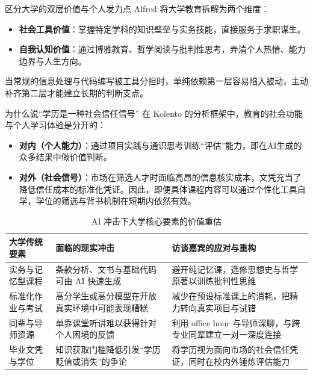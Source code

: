 \documentclass[UTF8,a4paper,11pt,fontset=fandol]{ctexart}
\begin{document}
\begin{importantbox}{区分大学的双层价值与个人发力点}
Alfred 将大学教育拆解为两个维度：
\begin{itemize}
\item \textbf{社会工具价值}：掌握特定学科的知识壁垒与实务技能，直接服务于求职谋生。
\item \textbf{自我认知价值}：通过博雅教育、哲学阅读与批判性思考，弄清个人热情、能力边界与人生方向。
\end{itemize}
当常规的信息处理与代码编写被工具分担时，单纯依赖第一层容易陷入被动，主动补齐第二层才能建立长期的判断支点。
\end{importantbox}
\begin{knowledgebox}{为什么说“学历是一种社会信任信号”}
在 Kolento 的分析框架中，教育的社会功能与个人学习体验是分开的：
\begin{itemize}
\item \textbf{对内（个人能力）}：通过项目实践与通识思考训练“评估”能力，即在AI生成的众多结果中做价值判断。
\item \textbf{对外（社会信号）}：市场在筛选人才时面临高昂的信息核实成本，文凭充当了降低信任成本的标准化凭证。因此，即便具体课程内容可以通过个性化工具自学，学位的筛选与背书机制在短期内依然有效。
\end{itemize}
\end{knowledgebox}
\begin{table}[H]\centering\small
\caption{AI 冲击下大学核心要素的价值重估}
\begin{tabular}{>{\raggedright\arraybackslash}p{\dimexpr(\linewidth-6\tabcolsep)/3\relax}>{\raggedright\arraybackslash}p{\dimexpr(\linewidth-6\tabcolsep)/3\relax}>{\raggedright\arraybackslash}p{\dimexpr(\linewidth-6\tabcolsep)/3\relax}}
\toprule
大学传统要素 & 面临的现实冲击 & 访谈嘉宾的应对与重构\\\midrule
实务与记忆型课程 & 条款分析、文书与基础代码可由 AI 快速生成 & 避开纯记忆课，选修思想史与哲学原著以训练批判性思维\\[4pt]
标准化作业与考试 & 高分学生或高分模型在开放真实环境中可能表现糟糕 & 减少在预设标准课上的消耗，把精力转向真实项目与试错\\[4pt]
同辈与导师资源 & 单靠课堂听讲难以获得针对个人困境的反馈 & 利用 office hour 与导师深聊，与跨专业同辈建立一对一深度连接\\[4pt]
毕业文凭与学位 & 知识获取门槛降低引发“学历贬值或消失”的争论 & 将学历视为面向市场的社会信任凭证，同时在校内外锤炼评估能力\\[4pt]
\bottomrule\end{tabular}\end{table}
\end{document}
